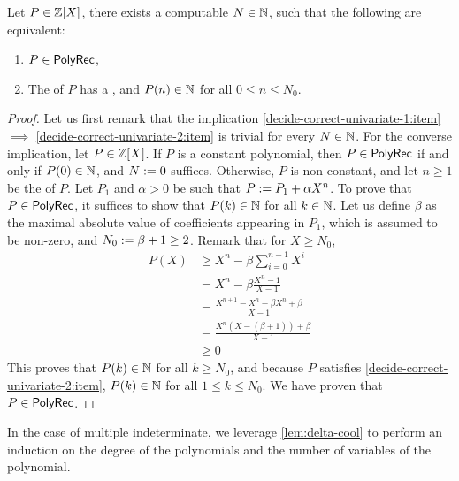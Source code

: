 \documentclass[sigconf,natbib=false,screen, review,anonymous]{acmart}
\begin{document}
\begin{lemma}
    \label{decide-correct-univariate:lemma}
    Let $P \in \mathbb{Z}[X]$, there exists a computable $N \in \mathbb{N}$,
    such that the following are equivalent:
    \begin{enumerate}
        \item \label{decide-correct-univariate-1:item}
            $P \in \mathsf{PolyRec}$,
        \item \label{decide-correct-univariate-2:item}
            The 
            of $P$ has a ,
            and $P(n) \in \mathbb{N}$
            for all $0 \leq n \leq N_0$.
    \end{enumerate}
\end{lemma}
\begin{proof}
    Let us first remark that the implication 
    \cref{decide-correct-univariate-1:item}
    $\implies$ \cref{decide-correct-univariate-2:item} is trivial for every
    $N \in \mathbb{N}$.
    For the converse implication,
    let $P \in \mathbb{Z}[X]$.
    If $P$ is a constant polynomial, then $P \in \mathsf{PolyRec}$
    if and only if $P(0) \in \mathbb{N}$, and $N \mathrel{:=} 0$
    suffices.
    Otherwise, $P$ is non-constant, and let $n \geq 1$ be the  of $P$.
    Let $P_1$ and $\alpha > 0$ be such that
    $P \mathrel{:=} P_1 + \alpha X^n$. 
    To prove that $P \in \mathsf{PolyRec}$, it suffices to show that
    $P(k) \in \mathbb{N}$ for all $k \in \mathbb{N}$.
    Let us define $\beta$ as the
    maximal absolute value of coefficients appearing in $P_1$, which is
    assumed to be non-zero,
    and $N_0 \mathrel{:=} \beta + 1 \geq 2$.
    Remark that for $X \geq N_0$,
    \begin{align*}
        P(X) &\geq X^n - \beta \sum_{i = 0}^{n-1} X^i \\
             &= X^n - \beta \frac{X^n - 1}{X - 1} \\
             &= \frac{X^{n+1} - X^n - \beta X^n + \beta}{X - 1} \\
             &= \frac{X^n(X - (\beta + 1)) + \beta}{X - 1} \\
             &\geq 0
    \end{align*}
    This proves that $P(k) \in \mathbb{N}$ for all $k \geq N_0$,
    and because $P$ satisfies \cref{decide-correct-univariate-2:item},
    $P(k) \in \mathbb{N}$ for all $1 \leq k \leq N_0$. We have proven 
    that $P \in \mathsf{PolyRec}$.
\end{proof}

In the case of multiple indeterminate, we leverage
\cref{lem:delta-cool} to perform an induction on the degree
of the polynomials and the number of variables of the polynomial.
\end{document}
